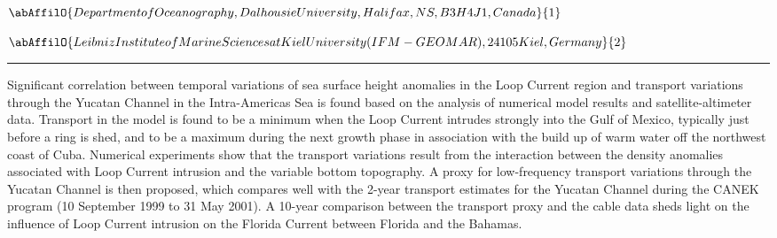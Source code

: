 \begin{center}
   \vspace{2 mm} \begin{center}
    \vspace{2 mm}\begin{center}
  
  $\abAffilO{Department of Oceanography, Dalhousie University, Halifax, NS, B3H 4J1, Canada}{1}$

  
  $\abAffilO{Leibniz Institute of Marine Sciences at Kiel University (IFM-GEOMAR), 24105 Kiel, Germany}{2}$

  \end{center}
  \vspace{2 mm}
  \end{center}\end{center}
  \begin{center}\rule{0.70\linewidth}{0.5 pt}\end{center}

\noindent Significant correlation between temporal variations of sea surface height anomalies in the Loop Current region and transport variations through the Yucatan Channel in the Intra-Americas Sea is found based on the analysis of numerical model results and satellite-altimeter data. Transport in the model is found to be a minimum when the Loop Current intrudes strongly into the Gulf of Mexico, typically just before a ring is shed, and to be a maximum during the next growth phase in association with the build up of warm water off the northwest coast of Cuba. Numerical experiments show that the transport variations result from the interaction between the density anomalies associated with Loop Current intrusion and the variable bottom topography. A proxy for low-frequency transport variations through the Yucatan Channel is then proposed, which compares well with the 2-year transport estimates for the Yucatan Channel during the CANEK program (10 September 1999 to 31 May 2001). A 10-year comparison between the transport proxy and the cable data sheds light on the influence of Loop Current intrusion on the Florida Current between Florida and the Bahamas.

